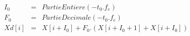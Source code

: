 \begin{eqnarray*}
I_0 & = & Partie Entiere(-t_0 . f_e ) \\
F_0 & = & Partie Decimale(-t_0 . f_e ) \\
Xd[i] & = & X[i+I_0] + F_0.\left( X[i+I_0+1] + X[i+I_0] \right) \\
\end{eqnarray*}
